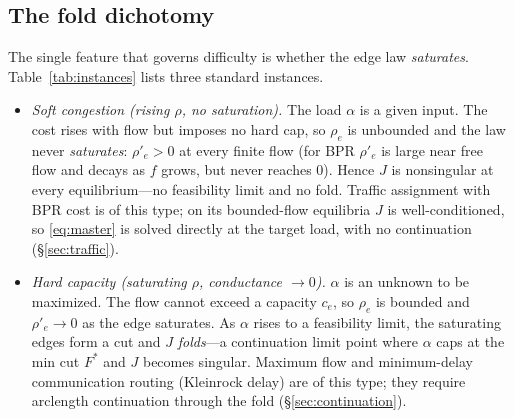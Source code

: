 \documentclass{siamart220329}
\begin{document}
\subsection{The fold dichotomy} The single feature that governs difficulty is whether the edge law
\emph{saturates}. Table~\ref{tab:instances} lists three standard instances.
\begin{itemize}[leftmargin=1.4em,itemsep=1pt]
\item \emph{Soft congestion (rising $\rho$, no saturation).} The load $\alpha$ is a given input. The cost rises with flow but
imposes no hard cap, so $\rho_e$ is unbounded and the law never \emph{saturates}: $\rho'_e>0$ at every
finite flow (for BPR $\rho'_e$ is large near free flow and decays as $f$ grows, but never reaches $0$).
Hence $J$ is nonsingular at every equilibrium---no feasibility limit and no fold.
Traffic assignment with BPR cost is of this type; on its bounded-flow equilibria $J$ is
well-conditioned, so \eqref{eq:master} is solved directly at the target load, with no continuation (\S\ref{sec:traffic}).
\item \emph{Hard capacity (saturating $\rho$, conductance $\to0$).} $\alpha$ is an unknown to be maximized. The flow cannot exceed a capacity
$c_e$, so $\rho_e$ is bounded and $\rho'_e\to0$ as the edge saturates. As $\alpha$ rises to a
feasibility limit, the saturating edges form a cut and $J$ \emph{folds}---a continuation
limit point where $\alpha$ caps at the min cut $F^*$ and $J$ becomes singular. Maximum flow and minimum-delay communication routing
(Kleinrock delay) are of this type; they require arclength continuation through
the fold (\S\ref{sec:continuation}).
\end{itemize}

\begin{table}[t]\centering\small
\caption{Three instances of the resistor-network framework \eqref{eq:master}. The edge law $\rho_e$
(flow vs.\ potential gradient) is the inverse of the marginal cost $t_e=\Phi_e'$. ``Fold'' marks a
feasibility limit where the conductance $\rho'_e\to0$ and $J$ becomes singular.}\label{tab:instances}
\end{table}
\end{document}
